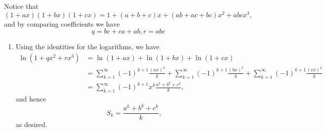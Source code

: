 \Question{\currfilebase}

Notice that
\[
    (1+ax)(1+bx)(1+cx) = 1 + (a + b + c) x + (ab + ac + bc) x^2 + abc x^3,
\]
and by comparing coefficients we have
\[
    q = bc + ca + ab, r = abc
\]

\begin{enumerate}
    \item Using the identities for the logarithms, we have
          \begin{align*}
              \ln(1 + qx^2 + rx^3) & = \ln(1 + ax) + \ln(1 + bx) + \ln(1 + cx)                                                                                                                         \\
                                   & = \sum_{k = 1}^{\infty} (-1)^{k + 1} \frac{(ax)^k}{k} + \sum_{k = 1}^{\infty} (-1)^{k + 1} \frac{(bx)^k}{k} + \sum_{k = 1}^{\infty} (-1)^{k + 1} \frac{(cx)^k}{k} \\
                                   & = \sum_{k = 1}^{\infty} (-1)^{k + 1} x^k \frac{a^k + b^k + c^k}{k},
          \end{align*}
          and hence
          \[
              S_k = \frac{a^k + b^k + c^k}{k},
          \]
          as desired.


\end{enumerate}
